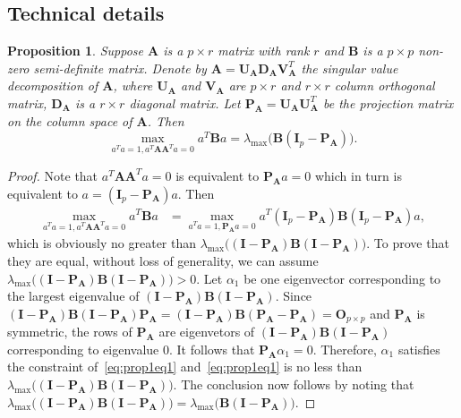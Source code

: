 \documentclass[12pt]{article} %
\newcommand{\bA}{\mathbf{A}}
\newcommand{\bB}{\mathbf{B}}
\newcommand{\bP}{\mathbf{P}}
\newcommand{\bO}{\mathbf{O}}
\newcommand{\bI}{\mathbf{I}}
\newcommand{\bU}{\mathbf{U}}
\newcommand{\bD}{\mathbf{D}}
\newcommand{\bV}{\mathbf{V}}
\newtheorem{proposition}{Proposition}
\theoremstyle{definition}
\begin{document}
\begin{appendices}
    \section{Technical details}\label{app}

\begin{proposition}\label{optProp}
    Suppose $\bA$ is a $p\times r$ matrix with rank $r$ and $\bB$ is a $p\times p$  non-zero semi-definite matrix.
    Denote by $\bA=\bU_\bA \bD_\bA \bV_\bA^T$ the singular value decomposition of $\bA$, where $\bU_\bA$ and $\bV_\bA$ are $p\times r$ and $r\times r$ column orthogonal matrix, $\bD_\bA$ is a $r\times r$ diagonal matrix.
    Let $\bP_\bA=\bU_\bA \bU_\bA^T$ be the projection matrix on the column space of $\bA$.
    Then
    \begin{equation}
        \max_{a^T a=1, a^T \bA \bA^T a=0}a^T \bB a=
        \lambda_{\max}\big(\bB(\bI_p-\bP_\bA)\big).
    \end{equation}
\end{proposition}
\begin{proof}
    Note that $a^T \bA \bA^T a=0$ is equivalent to $\bP_\bA a=0$ which in turn is equivalent to $a= (\bI_p-\bP_\bA)a$.
    Then
    \begin{equation}\label{eq:prop1eq1}
        \begin{aligned}
        \max_{a^T a=1, a^T \bA \bA^T a=0}a^T \bB a
            &=
        \max_{a^T a=1, \bP_\bA a=0}a^T(\bI_p-\bP_\bA) \bB (\bI_p-\bP_\bA)a,
        \end{aligned}
    \end{equation}
    which is obviously no greater than $\lambda_{\max}\big((\bI-\bP_\bA)\bB(\bI-\bP_\bA)\big)$.
    To prove that they are equal,  without loss of generality, we can assume $\lambda_{\max}\big((\bI-\bP_\bA)\bB(\bI-\bP_\bA)\big)>0$.
    Let $\alpha_1$ be one eigenvector corresponding to the largest eigenvalue of $(\bI-\bP_\bA)\bB(\bI-\bP_\bA)$.
    Since $(\bI-\bP_\bA)\bB(\bI-\bP_\bA)\bP_\bA=(\bI-\bP_\bA)\bB(\bP_\bA-\bP_\bA)=\bO_{p\times p}$ and $\bP_\bA$ is symmetric, the rows of $\bP_\bA$ are eigenvetors of $(\bI-\bP_\bA)\bB(\bI-\bP_\bA)$ corresponding to eigenvalue $0$.
    It follows that $\bP_\bA\alpha_1=0$.
    Therefore, $\alpha_1$ satisfies the constraint of~\eqref{eq:prop1eq1} and~\eqref{eq:prop1eq1} is no less than $\lambda_{\max}\big((\bI-\bP_\bA)\bB(\bI-\bP_\bA)\big)$.
    The conclusion now follows by noting that $\lambda_{\max}\big((\bI-\bP_\bA)\bB(\bI-\bP_\bA)\big)=\lambda_{\max}\big( \bB(\bI-\bP_\bA)\big)$.
    

\end{proof}
\end{appendices}
\end{document}
